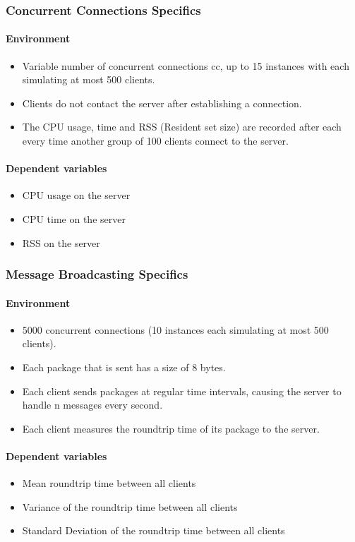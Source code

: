\documentclass[bsc,frontabs,twoside,singlespacing,parskip,deptreport]{infthesis}     %
\begin{document}
\subsubsection{Concurrent Connections Specifics}
\paragraph{Environment}
\begin{itemize}
\item Variable number of concurrent connections cc, up to 15 instances with each simulating at most 500 clients.
\item Clients do not contact the server after establishing a connection.
\item The CPU usage, time and RSS (Resident set size) are recorded after each every time another group of 100 clients connect to the server.
\end{itemize}
\paragraph{Dependent variables}
\begin{itemize}
\item CPU usage on the server
\item CPU time on the server
\item RSS on the server
\end{itemize}

\subsubsection{Message Broadcasting Specifics}
\paragraph{Environment}
\begin{itemize}
\item 5000 concurrent connections (10 instances each simulating at most 500 clients).
\item Each package that is sent has a size of 8 bytes.
\item Each client sends packages at regular time intervals, causing the server to handle n messages every second.
\item Each client measures the roundtrip time of its package to the server.
\end{itemize}

\paragraph{Dependent variables}
\begin{itemize}
\item Mean roundtrip time between all clients
\item Variance of the roundtrip time between all clients
\item Standard Deviation of the roundtrip time between all clients
\end{itemize}
\end{document}

